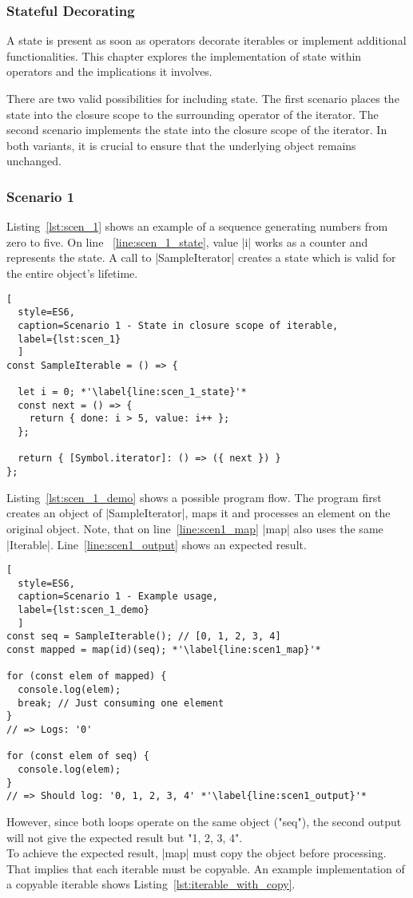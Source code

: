\subsubsection{Stateful Decorating}
\label{subsub:Stateful Decorating}
A state is present as soon as operators decorate iterables or implement 
additional functionalities. This chapter explores the implementation of state
within operators and the implications it involves.

There are two valid possibilities for including state.
The first scenario places the state into the closure scope to the surrounding 
operator of the iterator. The second scenario implements the state into the 
closure scope of the iterator. In both variants, it is crucial to ensure that 
the underlying object remains unchanged.

\subsubsection{Scenario 1}
\label{subsub:Scenario 1}
Listing~\ref{lst:scen_1} shows an example of a sequence generating numbers from
zero to five. On line ~\ref{line:scen_1_state}, value |i| works as a counter 
and represents the state. 
A call to |SampleIterator| creates a state which is valid for the entire 
object's lifetime.

\begin{lstlisting}[
  style=ES6, 
  caption=Scenario 1 - State in closure scope of iterable,
  label={lst:scen_1}
  ]
const SampleIterable = () => {

  let i = 0; *'\label{line:scen_1_state}'*
  const next = () => {
    return { done: i > 5, value: i++ };
  };

  return { [Symbol.iterator]: () => ({ next }) }
};
\end{lstlisting}

Listing~\ref{lst:scen_1_demo} shows a possible program flow. The program first
creates an object of |SampleIterator|, maps it and processes an element on the
original object. Note, that on line~\ref{line:scen1_map} |map| also uses the
same |Iterable|. Line~\ref{line:scen1_output} shows an expected result.

\begin{lstlisting}[
  style=ES6, 
  caption=Scenario 1 - Example usage,
  label={lst:scen_1_demo}
  ]
const seq = SampleIterable(); // [0, 1, 2, 3, 4]
const mapped = map(id)(seq); *'\label{line:scen1_map}'*

for (const elem of mapped) {
  console.log(elem);
  break; // Just consuming one element
}
// => Logs: '0'

for (const elem of seq) {
  console.log(elem);
}
// => Should log: '0, 1, 2, 3, 4' *'\label{line:scen1_output}'*
\end{lstlisting}
However, since both loops operate on the same object ("seq"), the second output
will not give the expected result but "1, 2, 3, 4".\\
To achieve the expected result, |map| must copy the object before processing.
That implies that each iterable must be copyable. An example implementation
of a copyable iterable shows Listing~\ref{lst:iterable_with_copy}.

